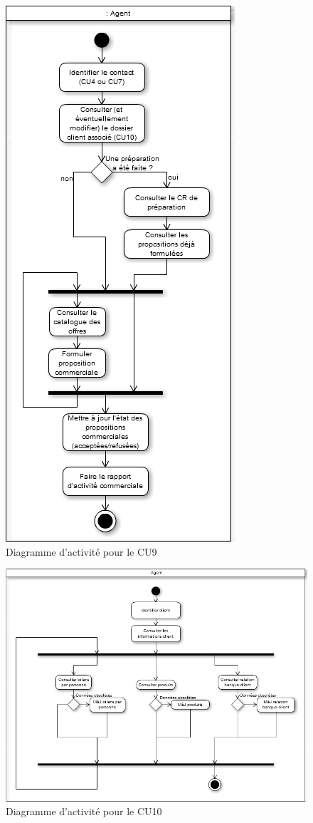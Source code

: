 \begin{figure}[H]
	\begin{center}
		\includegraphics[scale=0.4]{Includes/SOA-Activite-CU9.png}
		\caption{Diagramme d'activité pour le CU9}
	\end{center}
\end{figure}

\begin{figure}[H]
	\begin{center}
		\includegraphics[scale=0.4]{Includes/SOA-Activite-CU10.png}
		\caption{Diagramme d'activité pour le CU10}
	\end{center}
\end{figure}


